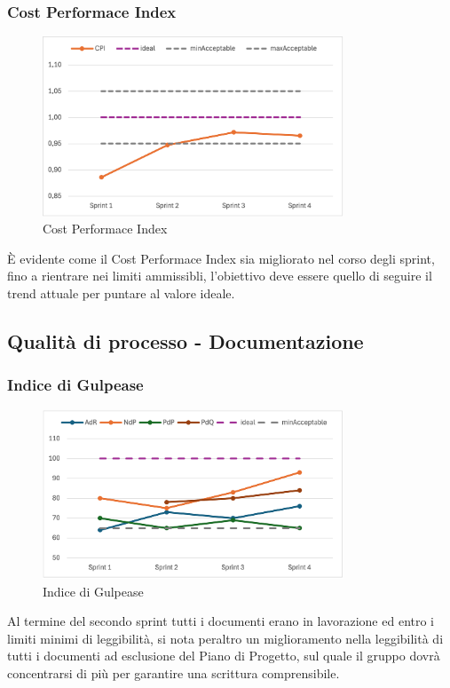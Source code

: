 \subsubsection{Cost Performace Index}
\begin{figure}[H]
    \centering
    \includegraphics[width=0.8\textwidth]{./images/CPI.png}
    \caption{Cost Performace Index}
\end{figure}
È evidente come il Cost Performace Index sia migliorato nel corso degli sprint, fino a rientrare nei limiti ammissibli, l'obiettivo deve essere quello di seguire il trend attuale per puntare al valore ideale.

\subsection{Qualità di processo - Documentazione}
\subsubsection{Indice di Gulpease}
\begin{figure}[H]
    \centering
    \includegraphics[width=0.8\textwidth]{./images/gulpease.png}
    \caption{Indice di Gulpease}
\end{figure}
Al termine del secondo sprint tutti i documenti erano in lavorazione ed entro i limiti minimi di leggibilità, si nota peraltro un miglioramento nella leggibilità di tutti i documenti ad esclusione del Piano di Progetto, sul quale il gruppo dovrà concentrarsi di più per garantire una scrittura comprensibile.


